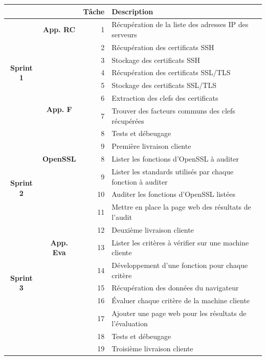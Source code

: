 \documentclass[a4paper,11pt,french]{article}
\begin{document}
\begin{tabular}{|c|c|r|l|}
\hline
&&\textbf{Tâche} & \textbf{Description}\\
\hline
\multirow{7}{*}{\begin{sideways}\textbf{Sprint 1}\end{sideways}}&{\textbf{App. RC}}
&  1 & Récupération de la liste des adresses IP des serveurs\\
&& 2 & Récupération des certificats SSH				\\
&& 3 & Stockage des certificats SSH 				\\
&& 4 & Récupération des certificats SSL/TLS 		\\
&& 5 & Stockage des certificats SSL/TLS				\\
\cline{2-4}
&\multirow{2}{*}{\textbf{App. F}}
&  6 &  Extraction des clefs des certificats\\
&& 7 &  Trouver des facteurs communs des clefs récupérées\\
&& 8 &  Tests et débeugage\\
&& 9 &  Première livraison cliente\\
\cline{1-4}
\multirow{4}{*}{\begin{sideways}\textbf{Sprint 2}\end{sideways}}&{\textbf{OpenSSL}}
&  8 &  Lister les fonctions d'OpenSSL à auditer\\
&& 9 &  Lister les standards utilisés par chaque fonction à auditer\\
&& 10 & Auditer les fonctions d'OpenSSL listées\\
&& 11 &Mettre en place la page web des résultats de l'audit\\
&& 12 &Deuxième livraison cliente\\
\hline

\multirow{5}{*}{\begin{sideways}\textbf{Sprint 3}\end{sideways}}&{\textbf{App. Eva}}
&  13 & Lister les critères à vérifier sur une machine cliente\\
&& 14 & Développement d'une fonction pour chaque critère\\
&& 15 & Récupération des données du navigateur\\
&& 16 & Évaluer chaque critère de la machine cliente\\
&& 17 & Ajouter une page web pour les résultats de l'évaluation\\
&& 18 & Tests et débeugage\\
&& 19 & Troisième livraison cliente\\
\hline

\end{tabular}
\end{document}
